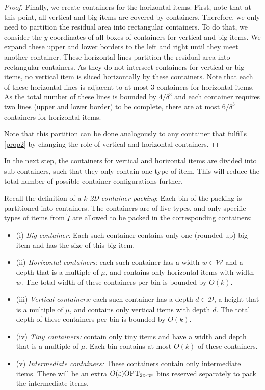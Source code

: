 \documentclass[a4paper,UKenglish,cleveref, autoref, thm-restate]{lipics-v2021}
\newcommand{\eps}{\varepsilon}
\newcommand{\opt}{\mathrm{OPT}}
\newcommand{\twobp}{\textsc{2d-bp}\xspace}
\newcommand{\inter}{intermediate\xspace}
\newcommand{\bigy}{big\xspace}
\newcommand{\tin}{tiny\xspace}
\begin{document}
\begin{proof}
Finally, we create containers for the horizontal items. 
First, note that at this point, all vertical and \bigy items are covered by containers.
Therefore, we only need to partition the residual area into rectangular containers.
To do that, we consider the $y$-coordinates of all boxes of containers for vertical and \bigy items. 
We expand these upper and lower borders to the left and right until they meet another container.
These horizontal lines partition the residual area into rectangular containers.
As they do not intersect containers for vertical or \bigy items, no vertical item is sliced horizontally by these containers.
Note that each of these horizontal lines is adjacent to at most $3$ containers for horizontal items. 
As the total number of these lines is bounded by $4/\delta^3$ and each container requires two lines (upper and lower border) to be complete, there are at most $6/\delta^3$ containers for horizontal items.

Note that this partition can be done analogously to any container that fulfills \cref{prop2} by changing the role of vertical and horizontal containers.
\end{proof}

In the next step, the containers for vertical and horizontal items are divided into sub-containers, such that they only contain one type of item. 
This will reduce the total number of possible container configurations further.

Recall the definition of a $k$-\emph{2D-container-packing}:
Each bin of the packing is partitioned into containers. 
The containers are of five types, and only specific types of items from $\tilde{I}$ are allowed to be packed in the corresponding containers:
\begin{itemize}
\item (i) {\em Big container:} Each such container contains only one (rounded up) \bigy item and has the size of this \bigy item.  
\item (ii) {\em Horizontal containers:} each such container has a width $w \in \mathcal{W}$ and a depth that is a multiple of $\mu$, and contains only horizontal items with width $w$.  
The total width of these containers per bin is bounded by $O(k)$.
\item (iii) {\em Vertical containers:} 
each such container has a depth $d \in \mathcal{D}$, a height that is a multiple of $\mu$, and contains only vertical items with depth $d$.
The total depth of these containers per bin is bounded by $O(k)$.
\item (iv) {\em Tiny containers:} contain only \tin items and have a width and depth that is a multiple of $\mu$. Each bin contains at most $O(k)$ of these containers.
\item (v) {\em Intermediate containers:} These containers contain only \inter items. There will be an extra $O(\eps)\opt_{\twobp}$ bins reserved separately to pack the \inter items.
\end{itemize}
\end{document}
